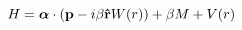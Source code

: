 \begin{equation}
H= {\mbox{\boldmath $\alpha$}}\cdot({\bf p}-i\beta{\bf {\hat  r}}W(r)) +
\beta M+V(r)
\end{equation}

